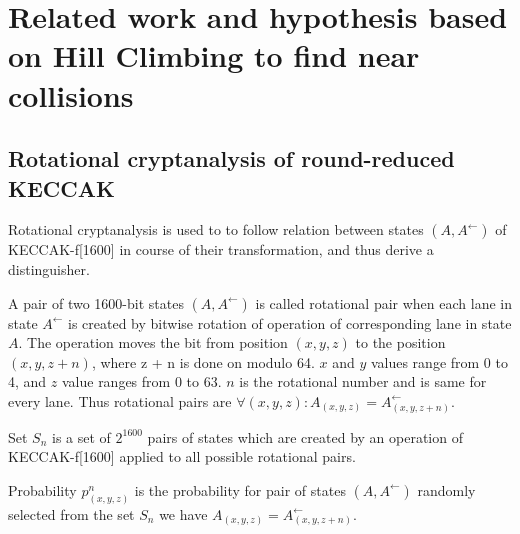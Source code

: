 \chapter{Related work and hypothesis based on Hill Climbing to find near collisions}


\section{Rotational cryptanalysis of round-reduced KECCAK}

Rotational cryptanalysis\cite{00041} is used to to follow relation between states $(A, A^{\leftarrow})$ of 
KECCAK-f[1600] in course of their transformation, and thus derive a distinguisher.

\begin{defn}
A pair of two 1600-bit states $(A, A^{\leftarrow})$ is called rotational pair when each lane in state $A^{\leftarrow}$
is created by bitwise rotation of operation of corresponding lane in state $A$. The operation moves the bit from 
position $(x, y, z)$ to the position $(x, y, z + n)$, where z + n is done on modulo 64. $x$ and $y$ values range from 0 
to 4, and $z$ value ranges from 0 to 63. $n$ is the rotational number and is same for every lane. Thus rotational pairs
are $\forall(x, y, z) : A_{(x, y, z)} = A^{\leftarrow}_{(x, y, z + n)}$. \cite{00022}
\end{defn}

\begin{defn}
Set $S_n$ is a set of $2^{1600}$ pairs of states which are created by an operation of KECCAK-f[1600] applied to all
possible rotational pairs. \cite{00022}
\end{defn}

\begin{defn}
Probability $p^{n}_{(x, y, z)}$ is the probability for pair of states $(A, A^{\leftarrow})$ randomly selected from the
set $S_n$ we have $A_{(x, y, z)} = A^{\leftarrow}_{(x, y, z + n)}$. \cite{00022}
\end{defn}

